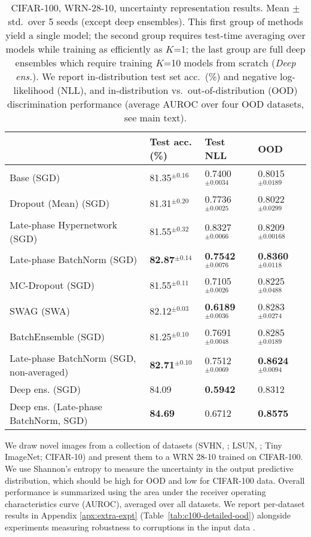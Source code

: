 \documentclass{article} \usepackage{iclr2021_conference,times}
\begin{document}
\setlength\intextsep{10pt}
\begin{table}[h]
\vspace{0.2cm}
\centering
\caption{CIFAR-100, WRN-28-10, uncertainty representation results. Mean $\pm$ std.~over 5 seeds (except deep ensembles). This first group of methods yield a single model; the second group requires test-time averaging over models while training as efficiently as $K$=1; the last group are full deep ensembles which require training $K$=10 models from scratch (\emph{Deep ens.}). We report in-distribution test set acc.~(\%) and negative log-likelihood (NLL), and in-distribution vs.~out-of-distribution (OOD) discrimination performance (average AUROC over four OOD datasets, see main text).\label{tab:ood}}
\begin{tabular}{llll}

\toprule
               & Test acc. (\%) & Test NLL & OOD \\\midrule
Base (SGD)            &   81.35$^{\pm 0.16}$ & 0.7400$^{\pm 0.0034}$ &   0.8015$^{\pm 0.0189}$         \\\midrule
Dropout (Mean) (SGD)     &    81.31$^{\pm 0.20}$       &0.7736$^{\pm 0.0025}$&      0.8022$^{\pm 0.0299}$    \\
Late-phase Hypernetwork (SGD)     &  81.55$^{\pm 0.32}$   & 0.8327$^{\pm 0.0066}$  &   0.8209$^{\pm 0.00168}$    \\
Late-phase BatchNorm (SGD)     &    \textbf{82.87}$^{\pm 0.14}$       &\textbf{0.7542}$^{\pm 0.0076}$&      \textbf{0.8360}$^{\pm 0.0118}$    \\
\midrule
MC-Dropout (SGD)     &    81.55$^{\pm 0.11}$       &0.7105$^{\pm 0.0026}$&      0.8225$^{\pm 0.0488}$    \\
SWAG (SWA)         & 82.12$^{\pm 0.03}$    &    \textbf{0.6189}$^{\pm 0.0036}$     &      0.8283$^{\pm 0.0274}$    \\
BatchEnsemble (SGD)     &    81.25$^{\pm 0.10}$       &0.7691$^{\pm 0.0048}$&      0.8285$^{\pm 0.0189}$    \\
Late-phase BatchNorm (SGD, non-averaged)     &    \textbf{82.71}$^{\pm 0.10}$       & 0.7512$^{\pm 0.0069}$&      \textbf{0.8624}$^{\pm 0.0094}$  \\
\midrule
Deep ens. (SGD) & 84.09 & \textbf{0.5942} &  0.8312 \\
Deep ens. (Late-phase BatchNorm, SGD) & \textbf{84.69} & 0.6712 &  \textbf{0.8575} \\\bottomrule       
\end{tabular}
\end{table}
We draw novel images from a collection of datasets (SVHN, \citet{netzer_reading_2011}; LSUN, \citet{yu_lsun_2015}; Tiny ImageNet; CIFAR-10) and present them to a WRN 28-10 trained on CIFAR-100.  We use Shannon's entropy \citep{cover_elements_2006} to measure the uncertainty in the output predictive distribution, which should be high for OOD and low for CIFAR-100 data. Overall performance is summarized using the area under the receiver operating characteristics curve (AUROC), averaged over all datasets. We report per-dataset results in Appendix \ref{apx:extra-expt} (Table~\ref{tab:c100-detailed-ood}) alongside experiments measuring robustness to corruptions in the input data \citep{hendrycks_benchmarking_2019}.
\end{document}
